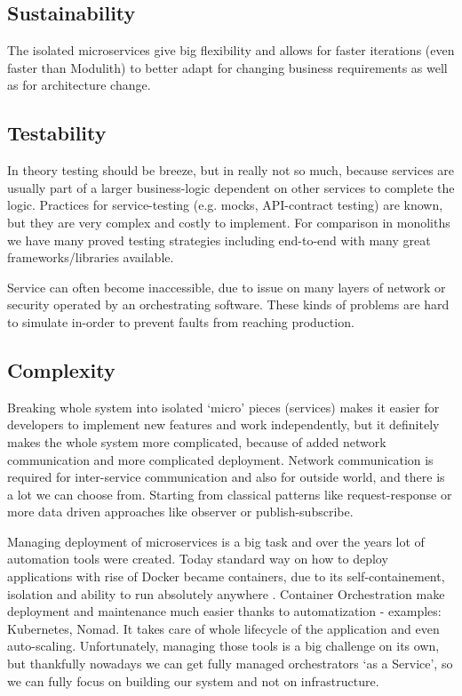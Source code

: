 \subsection{Sustainability}
The isolated microservices give big flexibility and allows for faster iterations (even faster than Modulith) to better adapt for changing business requirements as well as for architecture change.

\subsection{Testability}
In theory testing should be breeze, but in really not so much, because services are usually part of a larger business-logic dependent on other services to complete the logic. Practices for service-testing (e.g. mocks, API-contract testing) are known, but they are very complex and costly to implement. For comparison in  monoliths we have many proved testing strategies including end-to-end with many great frameworks/libraries available. \cite{MC_TESTABILITY}

Service can often become inaccessible, due to issue on many layers of network or security operated by an orchestrating software. These kinds of problems are hard to simulate in-order to prevent faults from reaching production.

\subsection{Complexity}
\label{section:microservices:complexity}
Breaking whole system into isolated `micro' pieces (services) makes it easier for developers to implement new features and work independently, but it definitely makes the whole system more complicated, because of added network communication and more complicated deployment. Network communication is required for inter-service communication and also for outside world, and there is a lot we can choose from. Starting from classical patterns like request-response or more data driven approaches like observer or publish-subscribe.

Managing deployment of microservices is a big task and over the years lot of automation tools were created. Today standard way on how to deploy applications with rise of Docker became containers, due to its self-containement, isolation and ability to run absolutely anywhere \cite{7093032}. Container Orchestration make deployment and maintenance much easier thanks to automatization - examples: Kubernetes\cite{KUBERNETES}, Nomad\cite{NOMAD}. It takes care of whole lifecycle of the application and even auto-scaling. Unfortunately, managing those tools is a big challenge on its own, but thankfully nowadays we can get fully managed orchestrators `as a Service', so we can fully focus on building our system and not on infrastructure.


